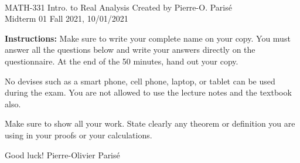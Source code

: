\documentclass[addpoints, 12pt]{exam}%
\theoremstyle{definition}
\begin{document}
	\noindent \hrulefill \\
	MATH-331 Intro. to Real Analysis \hfill Created by Pierre-O. Paris{\'e}\\
	Midterm 01 \hfill Fall 2021, 10/01/2021\\\vspace*{-0.7cm}
	
	\noindent\hrulefill
	
\vspace*{1cm}

\noindent{}

\vspace*{1cm}
\begin{center}
\gradetable[h][questions]
\end{center}
\vspace*{1cm}

{\bf Instructions:} Make sure to write your complete name on your copy. You must answer all the questions below and write your answers directly on the questionnaire. At the end of the 50 minutes, hand out your copy. 

No devises such as a smart phone, cell phone, laptop, or tablet can be used during the exam. You are not allowed to use the lecture notes and the textbook also.

Make sure to show all your work. State clearly any theorem or definition you are using in your proofs or your calculations.

\vspace*{2cm}
\noindent Good luck! \hfill Pierre-Olivier Parisé


\vspace*{0.5cm}

\newpage
\end{document}
